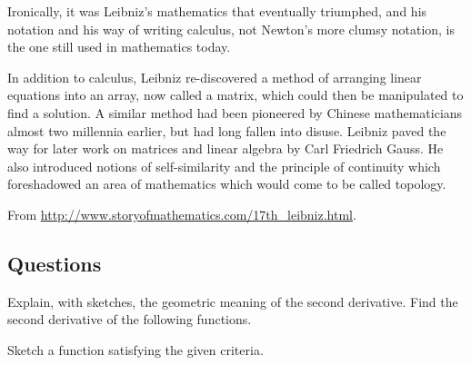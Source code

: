 Ironically, it was Leibniz’s mathematics that eventually triumphed, and his notation and his way of writing calculus, not Newton’s more clumsy notation, is the one still used in mathematics today.

In addition to calculus, Leibniz re-discovered a method of arranging linear equations into an array, now called a matrix, which could then be manipulated to find a solution. A similar method had been pioneered by Chinese mathematicians almost two millennia earlier, but had long fallen into disuse. Leibniz paved the way for later work on matrices and linear algebra by Carl Friedrich Gauss. He also introduced notions of self-similarity and the principle of continuity which foreshadowed an area of mathematics which would come to be called topology.

\begin{flushright}
  From \url{http://www.storyofmathematics.com/17th_leibniz.html}.
\end{flushright}

\clearpage
\subsection*{Questions}
\begin{questions}
  \question Explain, with sketches, the geometric meaning of the second derivative.
  \question Find the second derivative of the following functions.
  \question Sketch a function satisfying the given criteria.
\end{questions}

